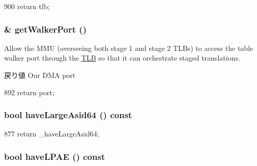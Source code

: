 \begin{DoxyCode}
900 { return tlb; }
\end{DoxyCode}
\hypertarget{classArmISA_1_1TableWalker_aab28913130b30d21077d9a054c46b81f}{
\subsubsection[{getWalkerPort}]{\& getWalkerPort ()}}
\label{classArmISA_1_1TableWalker_aab28913130b30d21077d9a054c46b81f}
Allow the MMU (overseeing both stage 1 and stage 2 TLBs) to access the table walker port through the \hyperlink{classArmISA_1_1TLB}{TLB} so that it can orchestrate staged translations.

\begin{DoxyReturn}{戻り値}
Our DMA port 
\end{DoxyReturn}



\begin{DoxyCode}
892 { return port; }
\end{DoxyCode}
\hypertarget{classArmISA_1_1TableWalker_a47958664a46869f3fb4f9b043da32be5}{
\subsubsection[{haveLargeAsid64}]{\setlength{\rightskip}{0pt plus 5cm}bool haveLargeAsid64 () const}}
\label{classArmISA_1_1TableWalker_a47958664a46869f3fb4f9b043da32be5}



\begin{DoxyCode}
877 { return _haveLargeAsid64; }
\end{DoxyCode}
\hypertarget{classArmISA_1_1TableWalker_a39b5e5d6cff3c8f5a248143a702d8f1a}{
\subsubsection[{haveLPAE}]{\setlength{\rightskip}{0pt plus 5cm}bool haveLPAE () const}}
\label{classArmISA_1_1TableWalker_a39b5e5d6cff3c8f5a248143a702d8f1a}




